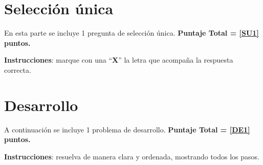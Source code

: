 \documentclass[11pt,twoside]{article}
\begin{document}
\newpage
\section*{Selección única}
En esta parte se incluye 1 pregunta de selección única.
\textbf{Puntaje Total = \ref*{SU1} puntos.}

\vspace{5mm}
\noindent\textbf{Instrucciones}: marque con una ``\textbf{X}'' la letra que
acompaña la respuesta correcta.

\begin{enumerate}[1.]
\end{enumerate}

\newpage
\section*{Desarrollo}
A continuación se incluye 1 problema de desarrollo.
\textbf{Puntaje Total = \ref*{DE1} puntos.}

\vspace{5mm}
\noindent\textbf{Instrucciones}: resuelva de manera clara y ordenada, mostrando
todos los pasos.
\end{document}
